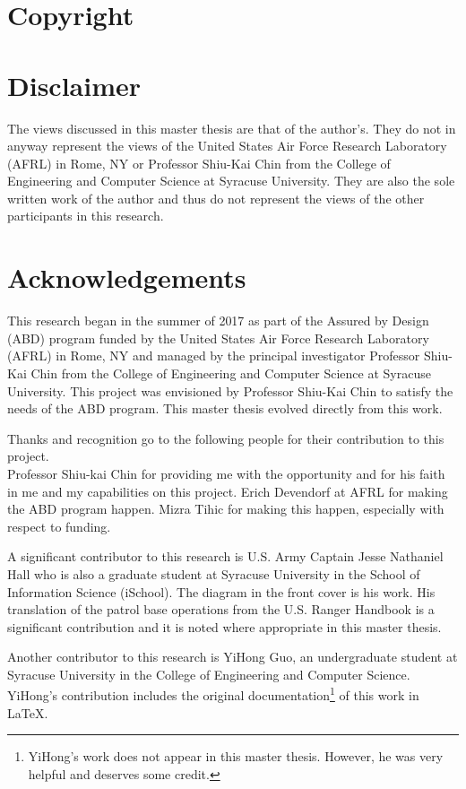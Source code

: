 \documentclass[../main/main.tex]{subfiles}
\begin{document}
\section*{Copyright}
\cleardoublepage

\section*{Disclaimer}
The views discussed in this master thesis are that of the author's.  They do not in anyway represent the views of the United States Air Force Research Laboratory (AFRL) in Rome, NY or  Professor Shiu-Kai Chin from the College of Engineering and Computer Science at Syracuse University.  They are also the sole written work of the author and thus do not represent the views of the other participants in this research.

\cleardoublepage

\section*{Acknowledgements}
This research began in the summer of 2017 as part of the Assured by Design (ABD) program funded by the United States Air Force Research Laboratory (AFRL) in Rome, NY and managed by the principal investigator Professor Shiu-Kai Chin from the College of Engineering and Computer Science at Syracuse University.  This project was envisioned by Professor Shiu-Kai Chin to satisfy the needs of the ABD program.  This master thesis evolved directly from this work.

Thanks and recognition go to the following people for their contribution to this project.\\
Professor Shiu-kai Chin for providing me with the opportunity and for his faith in me and my capabilities on this project.  Erich Devendorf at AFRL for making the ABD program happen. Mizra Tihic for making this happen, especially with respect to funding.

A significant contributor to this research is U.S. Army Captain Jesse Nathaniel Hall who is also a graduate student at Syracuse University in the School of Information Science (iSchool).  The diagram in the front cover is his work.  His translation of the patrol base operations from the U.S. Ranger Handbook is a significant contribution and it is noted where appropriate in this master thesis.

Another contributor to this research is YiHong Guo, an undergraduate student at Syracuse University in the College of Engineering and Computer Science. YiHong's contribution includes the original documentation\footnote{YiHong's work does not appear in this master thesis.  However, he was very helpful and deserves some credit.} of this work in LaTeX.  
\end{document}

